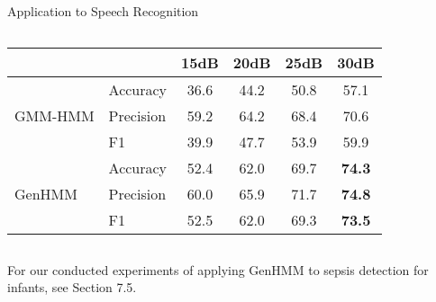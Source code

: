 \begin{frame}[label=current]{Application to Speech Recognition}
\begin{columns}
\begin{table}
\begin{adjustbox}{width=0.90\textwidth}
\begin{tabular}{llcccc}
                             && {15dB} &  {20dB} &  {25dB} & {30dB}  \\
      \midrule
      \multirow{3}{*}{GMM-HMM}
                             & Accuracy & 36.6 &  44.2 &  50.8 & 57.1
      \\
                             &Precision & 59.2 &  64.2 &  68.4 & 70.6  \\
                             & F1       & 39.9 &  47.7 &  53.9 & 59.9 \\
      \midrule
      \multirow{3}{*}{GenHMM}
                             & Accuracy & 52.4 & 62.0 &  69.7 & \textbf{74.3} \\
                             &Precision & 60.0 &  65.9 &  71.7 & \textbf{74.8}  \\
                             & F1       & 52.5 &  62.0 &  69.3 & \textbf{73.5} \\
      \bottomrule                                                                  
    \end{tabular}
    \end{adjustbox}
    \vspace{0.1cm}
  \end{table}
\end{columns}
For our conducted experiments of applying GenHMM to sepsis detection for infants, see Section 7.5.
\end{frame}

